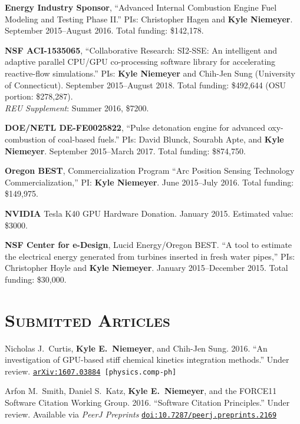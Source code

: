 \documentclass[margin,line,11pt]{res}
\makeatletter
\newlength{\bibhang}
\newlength{\bibsep}
 {\@listi \global\bibsep\itemsep \global\advance\bibsep by\parsep}
\newenvironment{bibenum*}
  {\renewcommand\labelenumi{\theenumi.}%
   \etaremune[
     topsep=0pt,
     itemsep=\bibsep,
     parsep=0pt,partopsep=0pt,
     itemindent=-\bibhang,
     leftmargin={\bibhang+\widthof{[999]}}]}
  {\endetaremune}
\newcommand*{\doi}[1]{\href{http://dx.doi.org/#1}{\nolinkurl{doi:#1}}}
\makeatother
\begin{document}
\begin{resume}
\textbf{Energy Industry Sponsor}, ``Advanced Internal Combustion Engine Fuel Modeling and Testing Phase II.'' PIs: Christopher Hagen and \textbf{Kyle Niemeyer}. September 2015--August 2016. Total funding: \$142,178.

\textbf{NSF ACI-1535065}, ``Collaborative Research: SI2-SSE: An intelligent and adaptive parallel CPU\slash GPU co-processing software library for accelerating reactive-flow simulations.'' PIs: \textbf{Kyle Niemeyer} and Chih-Jen Sung (University of Connecticut). September 2015--August 2018. Total funding: \$492,644 (OSU portion: \$278,287). \\
\textit{REU Supplement}: Summer 2016, \$7200.

\textbf{DOE\slash NETL DE-FE0025822}, ``Pulse detonation engine for advanced oxy-combustion of coal-based fuels.'' PIs: David Blunck, Sourabh Apte, and \textbf{Kyle Niemeyer}. September 2015--March 2017. Total funding: \$874,750.

\textbf{Oregon BEST}, Commercialization Program ``Arc Position Sensing Technology Commercialization,'' PI: \textbf{Kyle Niemeyer}. June 2015--July 2016. Total funding: \$149,975.

\textbf{NVIDIA} Tesla K40 GPU Hardware Donation. January 2015. Estimated value: \$3000.

\textbf{NSF Center for e-Design}, Lucid Energy\slash Oregon BEST. ``A tool to estimate the electrical energy generated from turbines inserted in fresh water pipes,'' PIs: Christopher Hoyle and \textbf{Kyle Niemeyer}. January 2015--December 2015. Total funding: \$30,000.

\section{\textsc{Submitted Articles}}

\begin{bibenum*}

\item Nicholas J.~Curtis, \textbf{Kyle E.\ Niemeyer}, and Chih-Jen Sung.
2016.
``An investigation of GPU-based stiff chemical kinetics integration methods.''
Under review. {\tt \href{http://arxiv.org/abs/1607.03884}{arXiv:1607.03884} [physics.comp-ph]}

\item Arfon M.~Smith, Daniel S.~Katz, \textbf{Kyle E.~Niemeyer}, and the FORCE11 Software Citation Working Group.
2016.
``Software Citation Principles.''
Under review. Available via \emph{PeerJ Preprints} \doi{10.7287/peerj.preprints.2169}


\end{bibenum*}
\end{resume}
\end{document}
